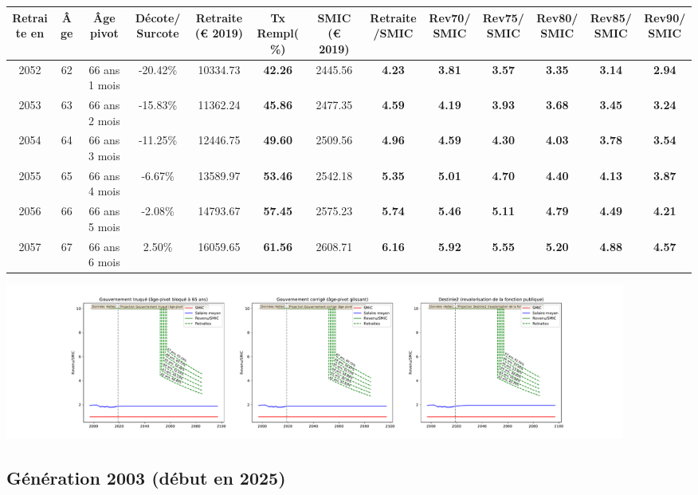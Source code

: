 { \scriptsize \begin{center} 
\begin{tabular}[htb]{|c|c||c|c||c|c||c||c|c|c|c|c|c|} 
\hline 
 Retraite en &  Âge &  Âge pivot &  Décote/Surcote &  Retraite (\euro{} 2019) &  Tx Rempl(\%) &  SMIC (\euro{} 2019) &  Retraite/SMIC &  Rev70/SMIC &  Rev75/SMIC &  Rev80/SMIC &  Rev85/SMIC &  Rev90/SMIC \\ 
\hline \hline 
 2052 &  62 &  66 ans 1 mois &  -20.42\% &  10334.73 &  {\bf 42.26} &  2445.56 &  {\bf 4.23} &  {\bf 3.81} &  {\bf 3.57} &  {\bf 3.35} &  {\bf 3.14} &  {\bf 2.94} \\ 
\hline 
 2053 &  63 &  66 ans 2 mois &  -15.83\% &  11362.24 &  {\bf 45.86} &  2477.35 &  {\bf 4.59} &  {\bf 4.19} &  {\bf 3.93} &  {\bf 3.68} &  {\bf 3.45} &  {\bf 3.24} \\ 
\hline 
 2054 &  64 &  66 ans 3 mois &  -11.25\% &  12446.75 &  {\bf 49.60} &  2509.56 &  {\bf 4.96} &  {\bf 4.59} &  {\bf 4.30} &  {\bf 4.03} &  {\bf 3.78} &  {\bf 3.54} \\ 
\hline 
 2055 &  65 &  66 ans 4 mois &  -6.67\% &  13589.97 &  {\bf 53.46} &  2542.18 &  {\bf 5.35} &  {\bf 5.01} &  {\bf 4.70} &  {\bf 4.40} &  {\bf 4.13} &  {\bf 3.87} \\ 
\hline 
 2056 &  66 &  66 ans 5 mois &  -2.08\% &  14793.67 &  {\bf 57.45} &  2575.23 &  {\bf 5.74} &  {\bf 5.46} &  {\bf 5.11} &  {\bf 4.79} &  {\bf 4.49} &  {\bf 4.21} \\ 
\hline 
 2057 &  67 &  66 ans 6 mois &  2.50\% &  16059.65 &  {\bf 61.56} &  2608.71 &  {\bf 6.16} &  {\bf 5.92} &  {\bf 5.55} &  {\bf 5.20} &  {\bf 4.88} &  {\bf 4.57} \\ 
\hline 
\hline 
\end{tabular} 
\end{center} } 

 \begin{center}\includegraphics[width=0.9\textwidth]{fig/Riche_1990_22_dest_retraite.pdf}\end{center} \label{fig/Riche_1990_22_dest_retraite.pdf} 

\newpage 
 
\subsection{Génération 2003 (début en 2025)} 

